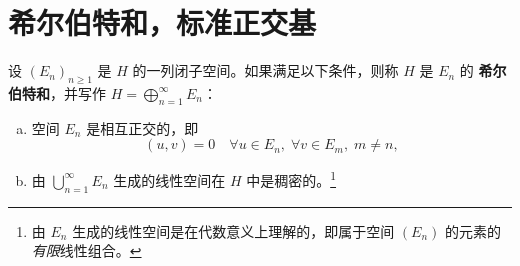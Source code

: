 \section{希尔伯特和，标准正交基}
\label{sec:5.4}

\begin{definition}
设 $(E_n)_{n \ge 1}$ 是 $H$ 的一列闭子空间。如果满足以下条件，则称 $H$ 是 $E_n$ 的 \textbf{希尔伯特和}，并写作 $H = \bigoplus_{n=1}^\infty E_n$：
\begin{enumerate}[(a)]
    \item 空间 $E_n$ 是相互正交的，即
    \[ (u,v)=0 \quad \forall u \in E_n, \; \forall v \in E_m, \; m \ne n, \]
    \item 由 $\bigcup_{n=1}^\infty E_n$ 生成的线性空间在 $H$ 中是稠密的。\footnote{由 $E_n$ 生成的线性空间是在代数意义上理解的，即属于空间 $(E_n)$ 的元素的\textit{有限}线性组合。}
\end{enumerate}
\end{definition}

